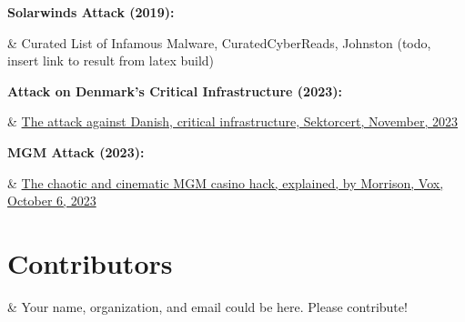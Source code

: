 \documentclass[a4paper]{article}
\begin{document}
	\noindent\textbf{Solarwinds Attack (2019):}
	\begin{easylist}[itemize]
	& Curated List of Infamous Malware, CuratedCyberReads, Johnston (todo, insert link to result from latex build)
	\end{easylist}

	\noindent\textbf{Attack on Denmark's Critical Infrastructure (2023):}
 	\begin{easylist}[itemize]
 	& \href{https://sektorcert.dk/wp-content/uploads/2023/11/SektorCERT-The-attack-against-Danish-critical-infrastructure-TLP-CLEAR.pdf}{The attack against Danish, critical infrastructure, Sektorcert, November, 2023}
 	\end{easylist}

	\noindent\textbf{MGM Attack (2023):}
 	\begin{easylist}[itemize]
 	& \href{https://www.vox.com/technology/2023/9/15/23875113/mgm-hack-casino-vishing-cybersecurity-ransomware}{The chaotic and cinematic MGM casino hack, explained, by Morrison, Vox, October 6, 2023}
 	\end{easylist}
  
	\section*{Contributors}
 	\begin{easylist}[itemize]
  	& Your name, organization, and email could be here.  Please contribute!
	\end{easylist}
\end{document}
